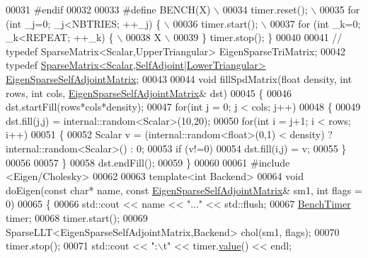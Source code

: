 \begin{DoxyCode}
00031 \textcolor{preprocessor}{#endif}
00032 
00033 \textcolor{preprocessor}{#define BENCH(X) \(\backslash\)}
00034 \textcolor{preprocessor}{  timer.reset(); \(\backslash\)}
00035 \textcolor{preprocessor}{  for (int \_j=0; \_j<NBTRIES; ++\_j) \{ \(\backslash\)}
00036 \textcolor{preprocessor}{    timer.start(); \(\backslash\)}
00037 \textcolor{preprocessor}{    for (int \_k=0; \_k<REPEAT; ++\_k) \{ \(\backslash\)}
00038 \textcolor{preprocessor}{        X  \(\backslash\)}
00039 \textcolor{preprocessor}{  \} timer.stop(); \}}
00040 
00041 \textcolor{comment}{// typedef SparseMatrix<Scalar,UpperTriangular> EigenSparseTriMatrix;}
00042 \textcolor{keyword}{typedef} \hyperlink{group___sparse_core___module_class_eigen_1_1_sparse_matrix}{SparseMatrix<Scalar,SelfAdjoint|LowerTriangular>} 
      \hyperlink{group___sparse_core___module_class_eigen_1_1_sparse_matrix}{EigenSparseSelfAdjointMatrix};
00043 
00044 \textcolor{keywordtype}{void} fillSpdMatrix(\textcolor{keywordtype}{float} density, \textcolor{keywordtype}{int} rows, \textcolor{keywordtype}{int} cols,  
      \hyperlink{group___sparse_core___module_class_eigen_1_1_sparse_matrix}{EigenSparseSelfAdjointMatrix}& dst)
00045 \{
00046   dst.startFill(rows*cols*density);
00047   \textcolor{keywordflow}{for}(\textcolor{keywordtype}{int} j = 0; j < cols; j++)
00048   \{
00049     dst.fill(j,j) = internal::random<Scalar>(10,20);
00050     \textcolor{keywordflow}{for}(\textcolor{keywordtype}{int} i = j+1; i < rows; i++)
00051     \{
00052       Scalar v = (internal::random<float>(0,1) < density) ? internal::random<Scalar>() : 0;
00053       \textcolor{keywordflow}{if} (v!=0)
00054         dst.fill(i,j) = v;
00055     \}
00056 
00057   \}
00058   dst.endFill();
00059 \}
00060 
00061 \textcolor{preprocessor}{#include <Eigen/Cholesky>}
00062 
00063 \textcolor{keyword}{template}<\textcolor{keywordtype}{int} Backend>
00064 \textcolor{keywordtype}{void} doEigen(\textcolor{keyword}{const} \textcolor{keywordtype}{char}* name, \textcolor{keyword}{const} \hyperlink{group___sparse_core___module_class_eigen_1_1_sparse_matrix}{EigenSparseSelfAdjointMatrix}& sm1, \textcolor{keywordtype}{int} 
      flags = 0)
00065 \{
00066   std::cout << name << \textcolor{stringliteral}{"..."} << std::flush;
00067   \hyperlink{class_eigen_1_1_bench_timer}{BenchTimer} timer;
00068   timer.start();
00069   SparseLLT<EigenSparseSelfAdjointMatrix,Backend> chol(sm1, flags);
00070   timer.stop();
00071   std::cout << \textcolor{stringliteral}{":\(\backslash\)t"} << timer.\hyperlink{class_eigen_1_1_bench_timer_a26760f963ed8b64c126159bfea57735e}{value}() << endl;

\end{DoxyCode}
